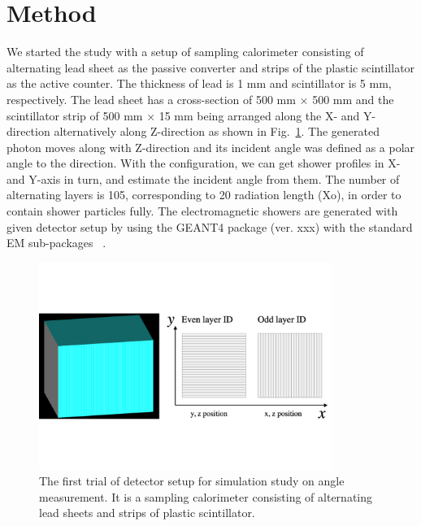 \documentclass[jkps,preprint,fleqn,showpacs,showkeys]{revtex4}
\begin{document}
\section{Method}
We started the study with a setup of sampling calorimeter consisting of alternating lead sheet as the passive converter and strips of the plastic scintillator as the active counter. %
The thickness of lead is 1 mm and scintillator is 5 mm, respectively. The lead sheet has a cross-section of  500 mm $\times$ 500 mm and the scintillator strip of 500 mm $\times$ 15 mm being arranged along the X- and Y-direction alternatively along Z-direction as shown in  Fig.~\ref{fig:det_conf}. The generated photon moves along with Z-direction and its incident angle was defined as a polar angle to the direction.  With the configuration, we can get shower profiles in X- and Y-axis in turn, and estimate the incident angle from them. The number of alternating layers is 105, corresponding to 20 radiation length (Xo), in order to contain shower particles fully. The electromagnetic showers are generated with given detector setup by using the GEANT4 package (ver. xxx) with the standard EM sub-packages ~\cite{GEANT4}. 

\begin{figure}[!hbt]
\includegraphics[width=0.85\textwidth]{figures/Sec2/Prototype_samplingcal.pdf}

\caption{ The first trial of detector setup for simulation study on angle measurement. It is a sampling calorimeter consisting of alternating lead sheets and strips of plastic scintillator. }
\label{fig:det_conf}
\end{figure}
\end{document}
